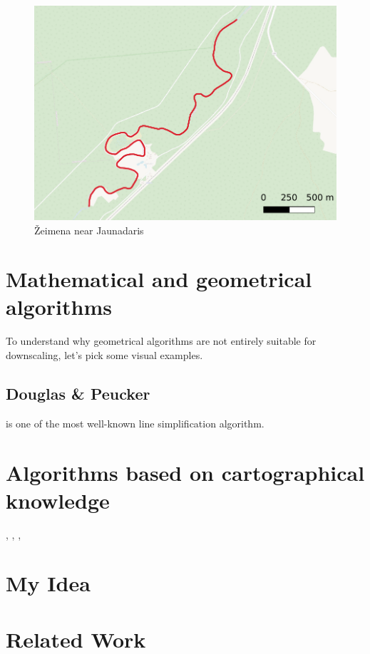 \documentclass{article}
\begin{document}
\begin{figure}
    \centering
    \includegraphics[width=\textwidth]{zeimena}
    \caption{Žeimena near Jaunadaris}
\end{figure}

\section{Mathematical and geometrical algorithms}

To understand why geometrical algorithms are not entirely suitable for 
downscaling, let's pick some visual examples.

\subsection{Douglas \& Peucker}

\cite{douglas1973algorithms} is one of the most well-known line simplification algorithm.


\section{Algorithms based on cartographical knowledge}

\cite{jiang2003line}, \cite{dyken2009simultaneous},
\cite{mustafa2006dynamic}, \cite{nollenburg2008morphing}

\section{My Idea}
\label{sec:my_idea}

\section{Related Work}
\label{sec:related_work}
\end{document}
